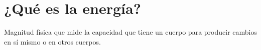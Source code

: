 %
%

\raggedbottom %

\section{¿Qué es la energía?}

\begin{definition}[Energía]
    Magnitud física que mide la capacidad que tiene un cuerpo para producir cambios en sí mismo o en otros cuerpos.
\end{definition}

